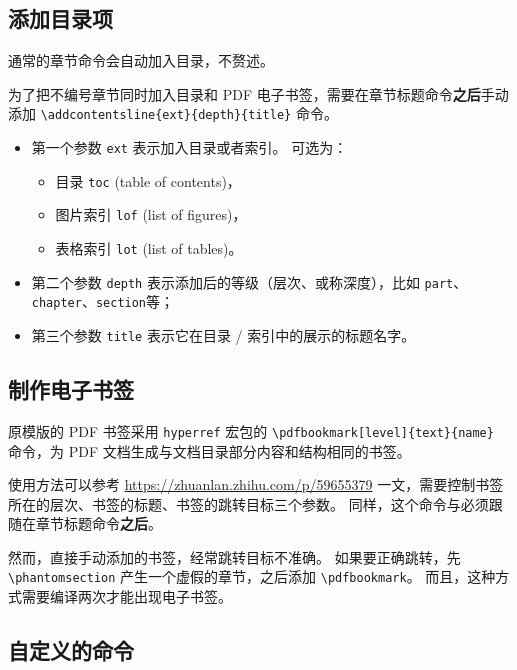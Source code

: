 \documentclass[../Main/thesis.tex]{subfiles}
\begin{document}
\subsection{添加目录项}

通常的章节命令会自动加入目录，不赘述。

为了把不编号章节同时加入目录和 PDF
电子书签，需要在章节标题命令\textbf{之后}手动添加
\texttt{\textbackslash{}addcontentsline\{ext\}\{depth\}\{title\}} 命令。

\begin{itemize}
\item
  第一个参数 \texttt{ext} 表示加入目录或者索引。 可选为：

  \begin{itemize}
  \item
    目录 \texttt{toc} (table of contents)，
  \item
    图片索引 \texttt{lof} (list of figures)，
  \item
    表格索引 \texttt{lot} (list of tables)。
  \end{itemize}
\item
  第二个参数 \texttt{depth} 表示添加后的等级（层次、或称深度），比如
  \texttt{part}、\texttt{chapter}、\texttt{section}等；
\item
  第三个参数 \texttt{title} 表示它在目录 / 索引中的展示的标题名字。
\end{itemize}

\subsection{制作电子书签}

原模版的 PDF 书签采用 \texttt{hyperref} 宏包的
\texttt{\textbackslash{}pdfbookmark{[}level{]}\{text\}\{name\}} 命令，为
PDF 文档生成与文档目录部分内容和结构相同的书签。

使用方法可以参考 \url{https://zhuanlan.zhihu.com/p/59655379}
一文，需要控制书签所在的层次、书签的标题、书签的跳转目标三个参数。
同样，这个命令与必须跟随在章节标题命令\textbf{之后}。

然而，直接手动添加的书签，经常跳转目标不准确。 如果要正确跳转，先
\texttt{\textbackslash{}phantomsection} 产生一个虚假的章节，之后添加
\texttt{\textbackslash{}pdfbookmark}。
而且，这种方式需要编译两次才能出现电子书签。

\subsection{自定义的命令}
\end{document}
